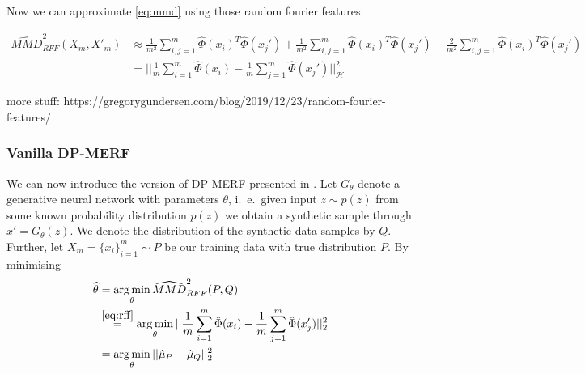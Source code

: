 Now we can approximate \cref{eq:mmd} using those random fourier features:

\begin{align} \label{eq:rff}
    \widehat{MMD}^2_{RFF}(X_m, X'_m) &\approx \frac{1}{m^2} \sum_{i,j=1}^m \hat{\Phi}(x_i)^T \hat{\Phi}(x_j') + \frac{1}{m^2} \sum_{i,j=1}^m \hat{\Phi}(x_i)^T \hat{\Phi}(x_j') - \frac{2}{m^2} \sum_{i,j=1}^m \hat{\Phi}(x_i)^T \hat{\Phi}(x_j') \nonumber \\
    &= || \frac{1}{m} \sum_{i=1}^m \hat{\Phi}(x_i) - \frac{1}{m} \sum_{j=1}^m \hat{\Phi}(x_j') ||_\mathcal{H}^2
\end{align}

more stuff: https://gregorygundersen.com/blog/2019/12/23/random-fourier-features/

\subsubsection{Vanilla DP-MERF}
We can now introduce the version of DP-MERF presented in \parencite{dpmerf}. Let $G_\theta$ denote a generative neural network with parameters $\theta$, i.\ e.\ given input $z \sim p(z)$ from some known probability distribution $p(z)$ we obtain a synthetic sample through $x' = G_\theta(z)$. We denote the distribution of the synthetic data samples by $Q$. Further, let $X_m = \{x_i\}_{i=1}^m \sim P$ be our training data with true distribution $P$. By minimising 
\begin{align}
    \widehat{\theta} &= \argmin_\theta \widehat{MMD}^2_{RFF}(P, Q) \nonumber \\
    &\overset{\cref{eq:rff}}{=} \argmin_\theta || \frac{1}{m} \sum_{i=1}^m \hat{\Phi}(x_i) - \frac{1}{m} \sum_{j=1}^m \hat{\Phi}(x_j') ||_2^2 \nonumber \\
    &= \argmin_\theta || \hat{\mu}_P - \hat{\mu}_Q ||_2^2
\end{align}

